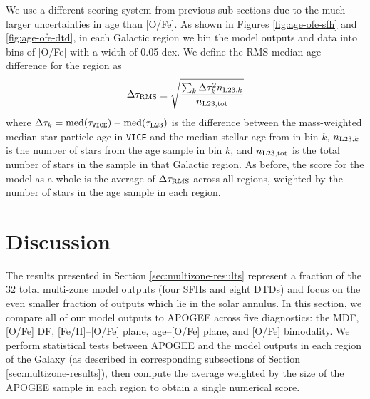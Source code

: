 \documentclass[twocolumn,twocolappendix,linenumbers,trackchanges]{aastex631}
\newcommand{\vice}{{\tt VICE}\xspace}
\begin{document}
We use a different scoring system from previous sub-sections due to the much larger uncertainties in age than [O/Fe]. As shown in Figures \ref{fig:age-ofe-sfh} and \ref{fig:age-ofe-dtd}, in each Galactic region we bin the model outputs and data into bins of [O/Fe] with a width of 0.05 dex. We define the RMS median age difference for the region as
\begin{equation}
    \Delta\tau_{\rm RMS} \equiv \sqrt{\frac{\sum_k \Delta\tau_k^2 n_{{\rm L23},k}}{n_{\rm L23,tot}}}
    \label{eq:age-ofe-score}
\end{equation}
where $\Delta\tau_k=\rm{med}(\tau_{\rm \vice})-\rm{med}(\tau_{\rm L23})$ is the difference between the mass-weighted median star particle age in \vice and the median stellar age from  in bin $k$, $n_{{\rm L23},k}$ is the number of stars from the  age sample in bin $k$, and $n_{\rm L23,tot}$ is the total number of stars in the sample in that Galactic region. As before, the score for the model as a whole is the average of $\Delta \tau_{\rm RMS}$ across all regions, weighted by the number of stars in the age sample in each region.


\section{Discussion}
\label{sec:discussion}

\vspace{-24pt}

The results presented in Section \ref{sec:multizone-results} represent a fraction of the 32 total multi-zone model outputs (four SFHs and eight DTDs) and focus on the even smaller fraction of outputs which lie in the solar annulus. 
In this section, we compare all of our model outputs to APOGEE across five diagnostics: the MDF, [O/Fe] DF, [Fe/H]--[O/Fe] plane, age--[O/Fe] plane, and [O/Fe] bimodality. We perform statistical tests between APOGEE and the model outputs in each region of the Galaxy (as described in corresponding subsections of Section \ref{sec:multizone-results}), then compute the average weighted by the size of the APOGEE sample in each region to obtain a single numerical score.
\end{document}
